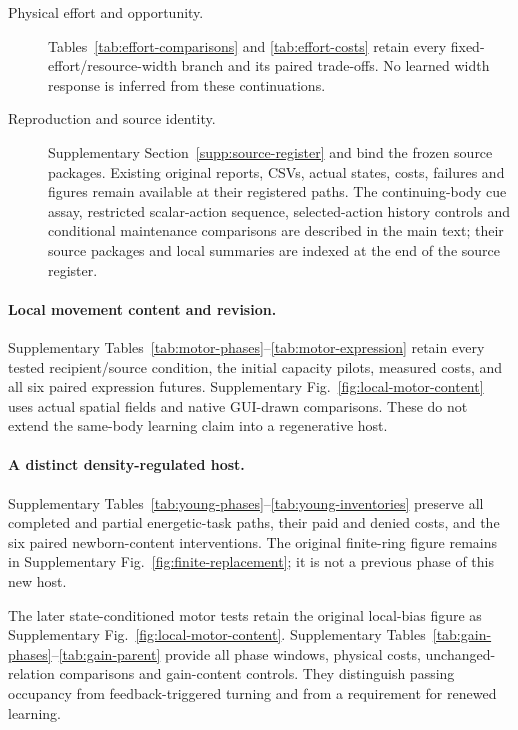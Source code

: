\begin{description}
\item[Physical effort and opportunity.] Tables~\ref{tab:effort-comparisons} and \ref{tab:effort-costs} retain every fixed-effort/resource-width branch and its paired trade-offs. No learned width response is inferred from these continuations.
\item[Reproduction and source identity.] Supplementary Section~\ref{supp:source-register} and  bind the frozen source packages. Existing original reports, CSVs, actual states, costs, failures and figures remain available at their registered paths. The continuing-body cue assay, restricted scalar-action sequence, selected-action history controls and conditional maintenance comparisons are described in the main text; their source packages and local summaries are indexed at the end of the source register.
\end{description}

\paragraph{Local movement content and revision.} Supplementary Tables~\ref{tab:motor-phases}--\ref{tab:motor-expression} retain every tested recipient/source condition, the initial capacity pilots, measured costs, and all six paired expression futures. Supplementary Fig.~\ref{fig:local-motor-content} uses actual spatial fields and native GUI-drawn comparisons. These do not extend the same-body learning claim into a regenerative host.

\paragraph{A distinct density-regulated host.} Supplementary Tables~\ref{tab:young-phases}--\ref{tab:young-inventories} preserve all completed and partial energetic-task paths, their paid and denied costs, and the six paired newborn-content interventions. The original finite-ring figure remains in Supplementary Fig.~\ref{fig:finite-replacement}; it is not a previous phase of this new host.

The later state-conditioned motor tests retain the original local-bias figure as Supplementary Fig.~\ref{fig:local-motor-content}. Supplementary Tables~\ref{tab:gain-phases}--\ref{tab:gain-parent} provide all phase windows, physical costs, unchanged-relation comparisons and gain-content controls. They distinguish passing occupancy from feedback-triggered turning and from a requirement for renewed learning.

